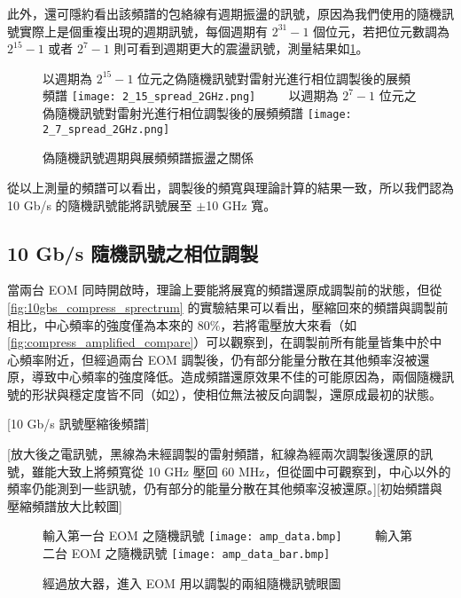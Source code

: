 \documentclass[class=NCU_thesis, crop=false]{standalone}
\begin{document}
此外，還可隱約看出該頻譜的包絡線有週期振盪的訊號，原因為我們使用的隨機訊號實際上是個重複出現的週期訊號，每個週期有 $2^{31}-1$ 個位元，若把位元數調為 $2^{15}-1$ 或者 $2^{7}-1$ 則可看到週期更大的震盪訊號，測量結果如\cref{fig:different_length_PRBS}。

\begin{figure}[!hbt]
    \centering
    \subcaptionbox
        {以週期為 $2^{15}-1$ 位元之偽隨機訊號對雷射光進行相位調製後的展頻頻譜
        \label{fig:subfig_fig1}}
        {\texttt{[image: 2\_15\_spread\_2GHz.png]}}
    ~~~~
    \subcaptionbox
        {以週期為 $2^{7}-1$ 位元之偽隨機訊號對雷射光進行相位調製後的展頻頻譜
        \label{fig:subfig_fig2}}
        {\texttt{[image: 2\_7\_spread\_2GHz.png]}}
    \caption{偽隨機訊號週期與展頻頻譜振盪之關係}
    \label{fig:different_length_PRBS}
\end{figure}

從以上測量的頻譜可以看出，調製後的頻寬與理論計算的結果一致，所以我們認為 10 Gb/s 的隨機訊號能將訊號展至 $\pm$10 GHz 寬。

\subsection{10 Gb/s 隨機訊號之相位調製}

當兩台 EOM 同時開啟時，理論上要能將展寬的頻譜還原成調製前的狀態，但從\cref{fig:10gbs_compress_sprectrum} 的實驗結果可以看出，壓縮回來的頻譜與調製前相比，中心頻率的強度僅為本來的 80\%，若將電壓放大來看（如\cref{fig:compress_amplified_compare}）可以觀察到，在調製前所有能量皆集中於中心頻率附近，但經過兩台 EOM 調製後，仍有部分能量分散在其他頻率沒被還原，導致中心頻率的強度降低。造成頻譜還原效果不佳的可能原因為，兩個隨機訊號的形狀與穩定度皆不同（如\cref{fig:amplified_signal}），使相位無法被反向調製，還原成最初的狀態。

[10 Gb/s 訊號壓縮後頻譜]

[放大後之電訊號，黑線為未經調製的雷射頻譜，紅線為經兩次調製後還原的訊號，雖能大致上將頻寬從 10 GHz 壓回 60 MHz，但從圖中可觀察到，中心以外的頻率仍能測到一些訊號，仍有部分的能量分散在其他頻率沒被還原。][初始頻譜與壓縮頻譜放大比較圖]

\begin{figure}[!hbt]
    \centering
    \subcaptionbox
        {輸入第一台 EOM 之隨機訊號
        \label{fig:subfig_fig1}}
        {\texttt{[image: amp\_data.bmp]}}
    ~~~~
    \subcaptionbox
        {輸入第二台 EOM 之隨機訊號
        \label{fig:subfig_fig2}}
        {\texttt{[image: amp\_data\_bar.bmp]}}
    \caption{經過放大器，進入 EOM 用以調製的兩組隨機訊號眼圖}
    \label{fig:amplified_signal}
\end{figure}
\end{document}
